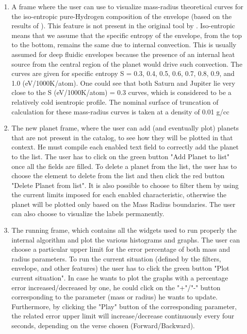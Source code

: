 \documentclass[preprint,12pt]{elsarticle}
\begin{document}
\begin{enumerate}
                \item A frame where the user can use to visualize mass-radius theoretical curves for the iso-entropic pure-Hydrogen composition of the envelope (based on the results of \textit{\cite{Becker2014}}). This feature is not present in the original tool by \textit{\cite{Zeng2021}}. Iso-entropic means that we assume that the specific entropy of the envelope, from the top to the bottom, remains the same due to internal convection. This is usually assumed for deep fluidic envelopes because the presence of an internal heat source from the central region of the planet would drive such convection. The curves are given for speciﬁc entropy S = 0.3, 0.4, 0.5, 0.6, 0.7, 0.8, 0.9, and 1.0 (eV/1000K/atom). One could see that both Saturn and Jupiter lie very close to the S (eV/1000K/atom) = 0.3 curves, which is considered to be a relatively cold isentropic profile. The nominal surface of truncation of calculation for these mass-radius curves is taken at a density of 0.01 g/cc
                \item The new planet frame, where the user can add (and eventually plot) planets that are not present in the catalog, to see how they will be plotted in that context. He must compile each enabled text field to correctly add the planet to the list. The user has to click on the green button "Add Planet to list" once all the fields are filled. To delete a planet from the list, the user has to choose the element to delete from the list and then click the red button "Delete Planet from list". It is also possible to choose to filter them by using the current limits imposed for each enabled characteristic, otherwise the planet will be plotted only based on the Mass Radius boundaries. The user can also choose to visualize the labels permanently. 
                \item The running frame, which contains all the widgets used to run properly the internal algorithm and plot the various histograms and graphs. The user can choose a particular upper limit for the error percentage of both mass and radius parameters. To run the current situation (defined by the filters, envelope, and other features) the user has to click the green button "Plot current situation". In case he wants to plot the graphs with a percentage error increased/decreased by one, he could click on the "+"/"-" button corresponding to the parameter (mass or radius) he wants to update. Furthermore, by clicking the "Play" button of the corresponding parameter, the related error upper limit will increase/decrease continuously every four seconds, depending on the verse chosen (Forward/Backward). 

\end{enumerate}
\end{document}
